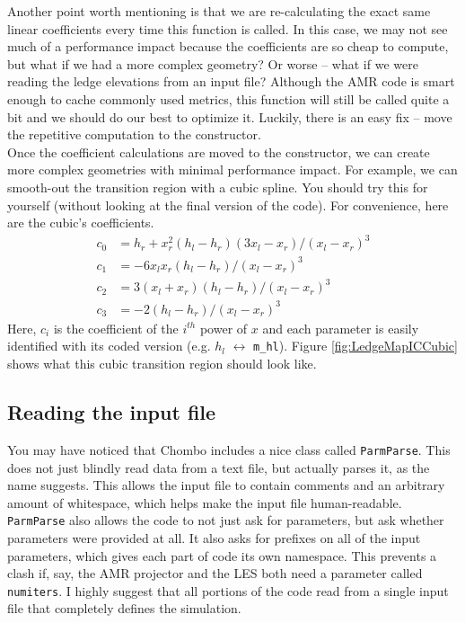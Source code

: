 \documentclass[12pt]{article}
\begin{document}
Another point worth mentioning is that we are re-calculating the exact same linear coefficients every time this function is called. In this case, we may not see much of a performance impact because the coefficients are so cheap to compute, but what if we had a more complex geometry? Or worse -- what if we were reading the ledge elevations from an input file? Although the AMR code is smart enough to cache commonly used metrics, this function will still be called quite a bit and we should do our best to optimize it. Luckily, there is an easy fix -- move the repetitive computation to the constructor.\\

Once the coefficient calculations are moved to the constructor, we can create more complex geometries with minimal performance impact. For example, we can smooth-out the transition region with a cubic spline. You should try this for yourself (without looking at the final version of the code). For convenience, here are the cubic's coefficients.
\begin{align*}
	c_0 &= h_r + x_r^2 (h_l-h_r) (3x_l-x_r) / (x_l-x_r)^3\\
	c_1 &= -6 x_l x_r (h_l-h_r) / (x_l-x_r)^3\\
	c_2 &= 3 (x_l+x_r) (h_l-h_r) / (x_l-x_r)^3\\
	c_3 &= -2 (h_l-h_r) / (x_l-x_r)^3
\end{align*}
Here, $c_i$ is the coefficient of the $i^{th}$ power of $x$ and each parameter is easily identified with its coded version (e.g. $h_l$ $\leftrightarrow$ \texttt{m\_hl}). Figure \ref{fig:LedgeMapICCubic} shows what this cubic transition region should look like.

\subsection{Reading the input file}\label{HowToReadFromTheInputFile}
You may have noticed that Chombo includes a nice class called \texttt{ParmParse}. This does not just blindly read data from a text file, but actually parses it, as the name suggests. This allows the input file to contain comments and an arbitrary amount of whitespace, which helps make the input file human-readable. \texttt{ParmParse} also allows the code to not just ask for parameters, but ask whether parameters were provided at all. It also asks for prefixes on all of the input parameters, which gives each part of code its own namespace. This prevents a clash if, say, the AMR projector and the LES both need a parameter called \texttt{numiters}. I highly suggest that all portions of the code read from a single input file that completely defines the simulation.\\
\end{document}
